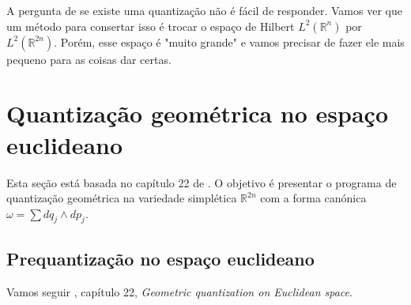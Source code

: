 A pergunta de se existe uma quantização não é fácil de responder. Vamos ver que um método para consertar isso é trocar o espaço de Hilbert $L^2(\mathbb{R}^n)$ por $L^2(\mathbb{R}^{2n})$. Porém, esse espaço é "muito grande" e vamos precisar de fazer ele mais pequeno para as coisas dar certas.

\section{Quantização geométrica no espaço euclideano}

Esta seção está basada no capítulo 22 de \cite{hallq}. O objetivo é presentar o programa de quantização geométrica na variedade simplética $\mathbb{R}^{2n}$ com a forma canónica $\omega=\sum dq_j\wedge dp_j$.

\subsection{Prequantização no espaço euclideano}

Vamos seguir \cite{hallq}, capítulo 22, \textit{Geometric quantization on Euclidean space}.

